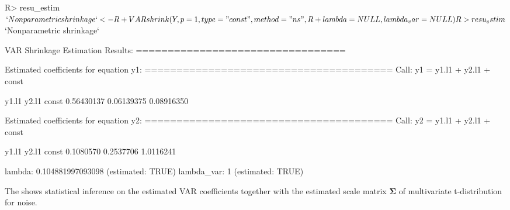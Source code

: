 \documentclass[
]{jss}
\begin{document}
\begin{CodeChunk}

\begin{CodeInput}
R> resu_estim$`Nonparametric shrinkage` <-
R+   VARshrink(Y, p = 1, type = "const", method = "ns",
R+                     lambda = NULL, lambda_var = NULL)
R> resu_estim$`Nonparametric shrinkage`
\end{CodeInput}

\begin{CodeOutput}

VAR Shrinkage Estimation Results:
================================= 

Estimated coefficients for equation y1: 
======================================= 
Call:
y1 = y1.l1 + y2.l1 + const 

     y1.l1      y2.l1      const 
0.56430137 0.06139375 0.08916350 


Estimated coefficients for equation y2: 
======================================= 
Call:
y2 = y1.l1 + y2.l1 + const 

    y1.l1     y2.l1     const 
0.1080570 0.2537706 1.0116241 


lambda: 0.104881997093098 (estimated: TRUE) 
lambda_var: 1 (estimated: TRUE) 
\end{CodeOutput}
\end{CodeChunk}

The  shows statistical inference on the estimated VAR
coefficients together with the estimated scale matrix
\(\mathbf{\Sigma}\) of multivariate t-distribution for noise.
\end{document}

